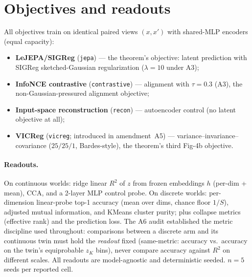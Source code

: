 \documentclass[11pt]{article}
\begin{document}
\section{Objectives and readouts}
\label{sec:objectives}
All objectives train on identical paired views $(x,x')$ with shared-MLP
encoders (equal capacity):
\begin{itemize}[leftmargin=*,itemsep=1pt]
\item \textbf{LeJEPA/SIGReg} (\texttt{jepa}) --- the theorem's objective:
latent prediction with SIGReg sketched-Gaussian regularization
($\lambda{=}10$ under A3);
\item \textbf{InfoNCE contrastive} (\texttt{contrastive}) --- alignment with
$\tau{=}0.3$ (A3), the non-Gaussian-pressured alignment objective;
\item \textbf{Input-space reconstruction} (\texttt{recon}) --- autoencoder
control (no latent objective at all);
\item \textbf{VICReg} (\texttt{vicreg}; introduced in amendment~A5) --- variance--invariance--
covariance ($25/25/1$, Bardes-style), the theorem's third Fig-4b objective.
\end{itemize}

\paragraph{Readouts.} \label{sec:readouts}
On continuous worlds: ridge linear $R^2$ of $z$ from frozen embeddings $h$
(per-dim + mean), CCA, and a 2-layer MLP control probe. On discrete worlds:
per-dimension linear-probe top-1 accuracy (mean over dims, chance floor
$1/S$), adjusted mutual information, and KMeans cluster purity; plus collapse
metrics (effective rank) and the prediction loss. The A6 audit established the
metric discipline used throughout: comparisons between a discrete arm and its
continuous twin must hold the \emph{readout} fixed (same-metric: accuracy vs.\
accuracy on the twin's equiprobable $z_K$ bins), never compare accuracy against
$R^2$ on different scales. All readouts are model-agnostic and deterministic
seeded. $n{=}5$ seeds per reported cell.
\end{document}

